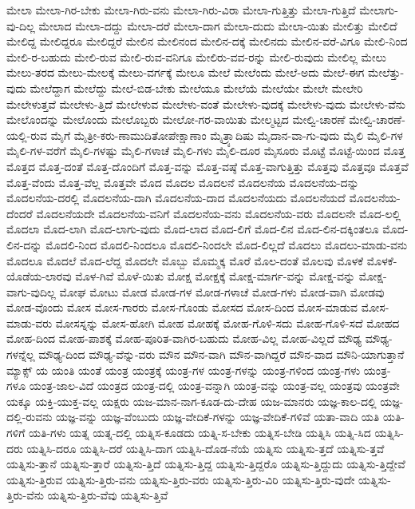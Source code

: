 {ಮೇಲಾ
ಮೇಲಾ-ಗಿರ-ಬೇಕು
ಮೇಲಾ-ಗಿರು-ವನು
ಮೇಲಾ-ಗಿರು-ವಿರಾ
ಮೇಲಾ-ಗುತ್ತಿತ್ತು
ಮೇಲಾ-ಗುತ್ತಿದೆ
ಮೇಲಾಗು-ವು-ದಿಲ್ಲ
ಮೇಲಾದ
ಮೇಲಾ-ದದ್ದು
ಮೇಲಾ-ದರೆ
ಮೇಲಾ-ದಾಗ
ಮೇಲಾ-ದುದು
ಮೇಲಾ-ಯಿತು
ಮೇಲಿತ್ತು
ಮೇಲಿದೆ
ಮೇಲಿದ್ದ
ಮೇಲಿದ್ದರೂ
ಮೇಲಿದ್ದರೆ
ಮೇಲಿನ
ಮೇಲಿನಂದ
ಮೇಲಿನ-ದಕ್ಕೆ
ಮೇಲಿನದು
ಮೇಲಿನ-ವರೆ-ವಿಗೂ
ಮೇಲಿ-ನಿಂದ
ಮೇಲಿ-ರ-ಬಹುದು
ಮೇಲಿ-ರುವ
ಮೇಲಿ-ರುವ-ವನಿಗೂ
ಮೇಲಿರು-ವವ-ರನ್ನು
ಮೇಲಿ-ರುವುದು
ಮೇಲಿಲ್ಲ
ಮೇಲು
ಮೇಲು-ತರದ
ಮೇಲು-ಮೇಲಕ್ಕೆ
ಮೇಲು-ವರ್ಗಕ್ಕೆ
ಮೇಲೂ
ಮೇಲೆ
ಮೇಲೆಂದು
ಮೇಲೆ-ಅದು
ಮೇಲೆ-ಈಗ
ಮೇಲೆತ್ತು-ವುದು
ಮೇಲೆದ್ದಾಗ
ಮೇಲೆದ್ದು
ಮೇಲೆ-ಬಿಡ-ಬೇಕು
ಮೇಲೆಯೂ
ಮೇಲೆಯೆ
ಮೇಲೆಯೇ
ಮೇಲೇ
ಮೇಲೇರಿ
ಮೇಲೇಳುತ್ತವೆ
ಮೇಲೇಳು-ತ್ತಿದೆ
ಮೇಲೇಳುವ
ಮೇಲೇಳು-ವಂತೆ
ಮೇಲೇಳು-ವುದಕ್ಕೆ
ಮೇಲೇಳು-ವುದು
ಮೇಲೇಳು-ವೆನು
ಮೇಲೊಂದನ್ನು
ಮೇಲೊಂದು
ಮೇಲೊಬ್ಬರು
ಮೇಲೋ-ಗರ-ವಾಯಿತು
ಮೇಲ್ಮಟ್ಟದ
ಮೇಲ್ವಿ-ಚಾರಣೆ
ಮೇಲ್ವಿ-ಚಾರಣೆ-ಯಲ್ಲಿ-ರುವ
ಮೈಗೆ
ಮೈತ್ರೀ-ಕರು-ಣಾಮುದಿತೋಪೇಕ್ಷಾಣಾಂ
ಮೈತ್ರ್ಯಾದಿಷು
ಮೈದಾನ-ವಾ-ಗು-ವುದು
ಮೈಲಿ
ಮೈಲಿ-ಗಳ
ಮೈಲಿ-ಗಳ-ವರೆಗೆ
ಮೈಲಿ-ಗಳಷ್ಟು
ಮೈಲಿ-ಗಳಾಚೆ
ಮೈಲಿ-ಗಳು
ಮೈಲಿ-ದೂರ
ಮೈಸೂರು
ಮೊಟ್ಟೆ
ಮೊಟ್ಟೆ-ಯಿಂದ
ಮೊತ್ತ
ಮೊತ್ತದ
ಮೊತ್ತ-ದಂತೆ
ಮೊತ್ತ-ದೊಂದಿಗೆ
ಮೊತ್ತ-ವನ್ನು
ಮೊತ್ತ-ವಷ್ಠೆ
ಮೊತ್ತ-ವಾಗುತ್ತಿತ್ತು
ಮೊತ್ತವು
ಮೊತ್ತವೂ
ಮೊತ್ತವೆ
ಮೊತ್ತ-ವೆಂದು
ಮೊತ್ತ-ವೆಲ್ಲ
ಮೊತ್ತವೇ
ಮೊದ
ಮೊದಲ
ಮೊದಲನೆ
ಮೊದಲನೆಯ
ಮೊದಲನೆಯ-ದನ್ನು
ಮೊದಲನೆಯ-ದರಲ್ಲಿ
ಮೊದಲನೆಯ-ದಾಗಿ
ಮೊದಲನೆಯ-ದಾದ
ಮೊದಲನೆಯದು
ಮೊದಲನೆಯದೆ
ಮೊದಲನೆಯ-ದೆಂದರೆ
ಮೊದಲನೆಯದೇ
ಮೊದಲನೆಯ-ವನಿಗೆ
ಮೊದಲನೆಯ-ವನು
ಮೊದಲನೆಯ-ವರು
ಮೊದಲನೇ
ಮೊದ-ಲಲ್ಲಿ
ಮೊದಲಾ
ಮೊದ-ಲಾಗಿ
ಮೊದ-ಲಾಗು-ವುದು
ಮೊದ-ಲಾದ
ಮೊದ-ಲಿಗೆ
ಮೊದ-ಲಿನ
ಮೊದ-ಲಿನ-ದಕ್ಕಿಂತಲೂ
ಮೊದ-ಲಿನ-ದನ್ನು
ಮೊದಲಿ-ನಿಂದ
ಮೊದಲಿ-ನಿಂದಲೂ
ಮೊದಲಿ-ನಿಂದಲೇ
ಮೊದ-ಲಿಲ್ಲದೆ
ಮೊದಲು
ಮೊದಲು-ಮಾಡು-ವನು
ಮೊದಲೂ
ಮೊದಲೆ
ಮೊದ-ಲೆದ್ದ
ಮೊದಲೇ
ಮೊಬ್ಬು
ಮೊಮ್ಮಕ್ಕ
ಮೊರೆ
ಮೊಲ-ದಂತೆ
ಮೊಲವು
ಮೊಳಕೆ
ಮೊಳಕೆ-ಯೊಡೆಯ-ಲಾರವು
ಮೊಳ-ಗಿವೆ
ಮೊಳೆ-ಯಿತು
ಮೋಕ್ಷ
ಮೋಕ್ಷಕ್ಕೆ
ಮೋಕ್ಷ-ಮಾರ್ಗ-ವನ್ನು
ಮೋಕ್ಷ-ವನ್ನು
ಮೋಕ್ಷ-ವಾಗು-ವುದಿಲ್ಲ
ಮೋಘ
ಮೋಟು
ಮೋಡ
ಮೋಡ-ಗಳ
ಮೋಡ-ಗಳಾಚೆ
ಮೋಡ-ಗಳು
ಮೋಡ-ವಾಗಿ
ಮೋಡವು
ಮೋಡ-ವೊಂದು
ಮೋಸ
ಮೋಸ-ಗಾರರು
ಮೋಸ-ಗೊಂಡು
ಮೋಸದ
ಮೋಸ-ದಿಂದ
ಮೋಸ-ಮಾಡುವ
ಮೋಸ-ಮಾಡು-ವರು
ಮೋಸಸ್ನನ್ನು
ಮೋಸ-ಹೋಗಿ
ಮೋಹ
ಮೋಹಕ್ಕೆ
ಮೋಹ-ಗೊಳಿ-ಸದು
ಮೋಹ-ಗೊಳಿ-ಸದೆ
ಮೋಹದ
ಮೋಹ-ದಿಂದ
ಮೋಹ-ಪಾಶಕ್ಕೆ
ಮೋಹ-ಪೂರಿತ-ವಾಗಿರ-ಬಹುದು
ಮೋಹ-ವಿಲ್ಲ
ಮೋಹ-ವಿಲ್ಲದೆ
ಮೌಢ್ಯ
ಮೌಢ್ಯ-ಗಳನ್ನೆಲ್ಲ
ಮೌಢ್ಯ-ದಿಂದ
ಮೌಢ್ಯ-ವೆನ್ನು-ವರು
ಮೌನ
ಮೌನ-ವಾಗಿ
ಮೌನ-ವಾಗಿದ್ದರೆ
ಮೌನ-ವಾದ
ಮೌನಿ-ಯಾಗುತ್ತಾನೆ
ಮ್ಯಾಕ್ಸ್
ಯ
ಯಂತಿ
ಯಂತೆ
ಯಂತ್ರ
ಯಂತ್ರಕ್ಕೆ
ಯಂತ್ರ-ಗಳ
ಯಂತ್ರ-ಗಳನ್ನು
ಯಂತ್ರ-ಗಳಿಂದ
ಯಂತ್ರ-ಗಳು
ಯಂತ್ರ-ಗಳೂ
ಯಂತ್ರ-ಜಾಲ-ವಿದೆ
ಯಂತ್ರದ
ಯಂತ್ರ-ದಲ್ಲಿ
ಯಂತ್ರ-ವನ್ನಾಗಿ
ಯಂತ್ರ-ವನ್ನು
ಯಂತ್ರ-ವಲ್ಲ
ಯಂತ್ರವು
ಯಂತ್ರವೇ
ಯಕ್ಕೂ
ಯಕ್ತಿ-ಯುಕ್ತ-ವಲ್ಲ
ಯಕ್ಷರು
ಯಜ-ಮಾನ-ನಾಗ-ಕೂಡ-ದು-ದೇಹ
ಯಜ-ಮಾನರು
ಯಜ್ಞ-ಕಾಲ-ದಲ್ಲಿ
ಯಜ್ಞ-ದಲ್ಲಿ-ರುವನು
ಯಜ್ಞ-ವನ್ನು
ಯಜ್ಞ-ವೆಂಬುದು
ಯಜ್ಞ-ವೇದಿಕೆ-ಗಳನ್ನು
ಯಜ್ಞ-ವೇದಿಕೆ-ಗಳಿವೆ
ಯತಾ-ವಾದಿ
ಯತಿ
ಯತಿ-ಗಳಿಗೆ
ಯತಿ-ಗಳು
ಯತ್ನ
ಯತ್ನ-ದಲ್ಲಿ
ಯತ್ನಿಸ-ಕೂಡದು
ಯತ್ನಿ-ಸ-ಬೇಕು
ಯತ್ನಿಸ-ಬೇಡಿ
ಯತ್ನಿಸಿ
ಯತ್ನಿ-ಸಿದ
ಯತ್ನಿಸಿ-ದರು
ಯತ್ನಿಸಿ-ದರೂ
ಯತ್ನಿಸಿ-ದರೆ
ಯತ್ನಿಸಿ-ದಾಗ
ಯತ್ನಿಸಿ-ದೊಡ-ನೆಯೆ
ಯತ್ನಿಸು
ಯತ್ನಿಸು-ತ್ತದೆ
ಯತ್ನಿಸು-ತ್ತವೆ
ಯತ್ನಿಸು-ತ್ತಾನೆ
ಯತ್ನಿಸು-ತ್ತಾರೆ
ಯತ್ನಿಸು-ತ್ತಿದೆ
ಯತ್ನಿಸು-ತ್ತಿದ್ದ
ಯತ್ನಿಸು-ತ್ತಿದ್ದರೊ
ಯತ್ನಿಸು-ತ್ತಿದ್ದುದು
ಯತ್ನಿಸು-ತ್ತಿದ್ದೇವೆ
ಯತ್ನಿಸು-ತ್ತಿರುವ
ಯತ್ನಿಸು-ತ್ತಿರು-ವನು
ಯತ್ನಿಸು-ತ್ತಿರು-ವರು
ಯತ್ನಿಸು-ತ್ತಿರು-ವಿರಿ
ಯತ್ನಿಸು-ತ್ತಿರು-ವುದೇ
ಯತ್ನಿಸು-ತ್ತಿರು-ವೆನು
ಯತ್ನಿಸು-ತ್ತಿರು-ವೆವು
ಯತ್ನಿಸು-ತ್ತಿವೆ
}
